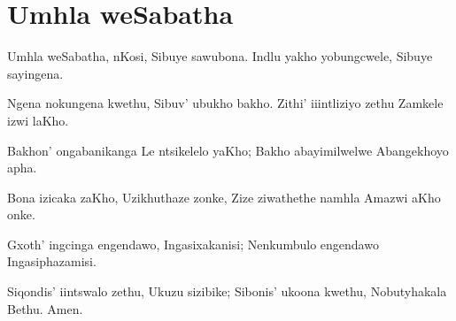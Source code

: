 \starttocol
\chapter{Umhla weSabatha}
\nexttocol
\hfill{\it }
\stoptocol
\starttocol
\startlines
{\sc Umhla} weSabatha, nKosi,
Sibuye sawubona.
Indlu yakho yobungcwele,
Sibuye sayingena.

Ngena nokungena kwethu,
Sibuv' ubukho bakho.
Zithi' iiintliziyo zethu
Zamkele izwi laKho.

Bakhon' ongabanikanga
Le ntsikelelo yaKho;
Bakho abayimilwelwe
Abangekhoyo apha.

Bona izicaka zaKho,
Uzikhuthaze zonke,
Zize ziwathethe namhla
Amazwi aKho onke.

Gxoth' ingcinga engendawo, 
Ingasixakanisi; 
Nenkumbulo engendawo
Ingasiphazamisi.

Siqondis' iintswalo zethu,
Ukuzu sizibike;
Sibonis' ukoona kwethu,
Nobutyhakala Bethu. 
          \hfill Amen.~~~~~~~~~

\stoplines
\nexttocol

\stoptocol
